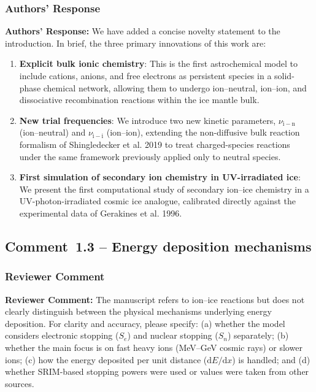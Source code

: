 \documentclass[12pt]{article}
\newcommand{\reviewlabel}{\textbf{\textcolor{commentframe}{Reviewer Comment:}}}
\newcommand{\responselabel}{\textbf{\textcolor{responseframe}{Authors' Response:}}}
\begin{document}
\subsubsection{Authors' Response}
\begin{responsebox}
\responselabel{} We have added a concise novelty statement to the introduction.
In brief, the three primary innovations of this work are:
\begin{enumerate}[nosep]
  \item \textbf{Explicit bulk ionic chemistry}: This is the first astrochemical
        model to include cations, anions, and free electrons as persistent
        species in a solid-phase chemical network, allowing them to undergo
        ion--neutral, ion--ion, and dissociative recombination reactions within
        the ice mantle bulk.
  \item \textbf{New trial frequencies}: We introduce two new kinetic parameters,
        $\nu_\mathrm{i-n}$ (ion--neutral) and $\nu_\mathrm{i-i}$ (ion--ion),
        extending the non-diffusive bulk reaction formalism of
        Shingledecker et al. 2019 to treat charged-species
        reactions under the same framework previously applied only to neutral
        species.
  \item \textbf{First simulation of secondary ion chemistry in UV-irradiated
        ice}: We present the first computational study of secondary ion--ice
        chemistry in a UV-photon-irradiated cosmic ice analogue, calibrated
        directly against the experimental data of Gerakines et al. 1996.
\end{enumerate}
\end{responsebox}

\subsection{Comment~1.3 -- Energy deposition mechanisms}

\subsubsection{Reviewer Comment}
\begin{reviewerbox}
\reviewlabel{} The manuscript refers to ion--ice reactions but does not
clearly distinguish between the physical mechanisms underlying energy
deposition. For clarity and accuracy, please specify: (a) whether the model
considers electronic stopping ($S_e$) and nuclear stopping ($S_n$) separately;
(b) whether the main focus is on fast heavy ions (MeV--GeV cosmic rays) or
slower ions; (c) how the energy deposited per unit distance ($\mathrm{d}E/\mathrm{d}x$)
is handled; and (d) whether SRIM-based stopping powers were used or values
were taken from other sources.
\end{reviewerbox}
\end{document}

